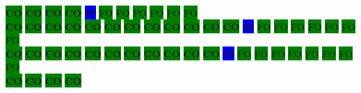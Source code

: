\colorbox{green}{\color[rgb]{0,0,0}\textbf{CO}}%
\colorbox{green}{\color[rgb]{0,0,0}\textbf{CO}}%
\colorbox{green}{\color[rgb]{0,0,0}\textbf{CO}}%
\colorbox{green}{\color[rgb]{0,0,0}\textbf{CO}}%
\colorbox{blue}{\color[rgb]{1,0,0}\textbf{07}}%
\colorbox{green}{\color[gray]{0.75}FO}%
\colorbox{green}{\color[gray]{0.75}FO}%
\colorbox{green}{\color[gray]{0.75}FO}%
\colorbox{green}{\color[gray]{0.75}FO}%
\colorbox{green}{\color[gray]{0.75}FO}%
\colorbox{green}{\color[gray]{0.75}FO}%
\\
\colorbox{green}{\color[rgb]{0,0,0}\textbf{CO}}%
\colorbox{green}{\color[rgb]{0,0,0}\textbf{CO}}%
\colorbox{green}{\color[rgb]{0,0,0}\textbf{CO}}%
\colorbox{green}{\color[rgb]{0,0,0}\textbf{CO}}%
\colorbox{green}{\color[rgb]{0,0,0}\textbf{CO}}%
\colorbox{green}{\color[rgb]{0,0,0}\textbf{CO}}%
\colorbox{green}{\color[rgb]{0,0,0}\textbf{CO}}%
\colorbox{green}{\color[rgb]{0,0,0}\textbf{CO}}%
\colorbox{green}{\color[rgb]{0,0,0}\textbf{CO}}%
\colorbox{green}{\color[rgb]{0,0,0}\textbf{CO}}%
\colorbox{green}{\color[rgb]{0,0,0}\textbf{CO}}%
\colorbox{green}{\color[rgb]{0,0,0}\textbf{CO}}%
\colorbox{blue}{\color[rgb]{1,0,0}\textbf{05}}%
\colorbox{green}{\color[gray]{0.75}FO}%
\colorbox{green}{\color[gray]{0.75}FO}%
\colorbox{green}{\color[gray]{0.75}FO}%
\colorbox{green}{\color[gray]{0.75}FO}%
\colorbox{green}{\color[gray]{0.75}FO}%
\colorbox{green}{\color[gray]{0.75}FO}%
\colorbox{green}{\color[gray]{0.75}FO}%
\\
\colorbox{green}{\color[rgb]{0,0,0}\textbf{CO}}%
\colorbox{green}{\color[rgb]{0,0,0}\textbf{CO}}%
\colorbox{green}{\color[rgb]{0,0,0}\textbf{CO}}%
\colorbox{green}{\color[rgb]{0,0,0}\textbf{CO}}%
\colorbox{green}{\color[rgb]{0,0,0}\textbf{CO}}%
\colorbox{green}{\color[rgb]{0,0,0}\textbf{CO}}%
\colorbox{green}{\color[rgb]{0,0,0}\textbf{CO}}%
\colorbox{green}{\color[rgb]{0,0,0}\textbf{CO}}%
\colorbox{green}{\color[rgb]{0,0,0}\textbf{CO}}%
\colorbox{green}{\color[rgb]{0,0,0}\textbf{CO}}%
\colorbox{green}{\color[rgb]{0,0,0}\textbf{CO}}%
\colorbox{blue}{\color[rgb]{1,0,0}\textbf{03}}%
\colorbox{green}{\color[gray]{0.75}FO}%
\colorbox{green}{\color[gray]{0.75}FO}%
\colorbox{green}{\color[gray]{0.75}FO}%
\colorbox{green}{\color[gray]{0.75}FO}%
\colorbox{green}{\color[gray]{0.75}FO}%
\colorbox{green}{\color[gray]{0.75}FO}%
\colorbox{green}{\color[gray]{0.75}FO}%
\colorbox{green}{\color[gray]{0.75}FO}%
\\
\colorbox{green}{\color[rgb]{0,0,0}\textbf{CO}}%
\colorbox{green}{\color[rgb]{0,0,0}\textbf{CO}}%
\colorbox{green}{\color[rgb]{0,0,0}\textbf{CO}}%
\colorbox{green}{\color[rgb]{0,0,0}\textbf{CO}}%
